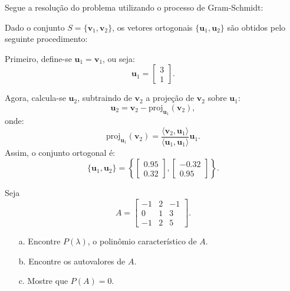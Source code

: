 \begin{resolution}
  Segue a resolução do problema utilizando o processo de Gram-Schmidt:

  Dado o conjunto \( S = \{\mathbf{v}_1, \mathbf{v}_2\} \), os vetores ortogonais \( \{\mathbf{u}_1, \mathbf{u}_2\} \) são obtidos pelo seguinte procedimento:

  Primeiro, define-se \( \mathbf{u}_1 = \mathbf{v}_1 \), ou seja:
  \[
    \mathbf{u}_1 = \begin{bmatrix} 3 \\ 1 \end{bmatrix}.
  \]

  Agora, calcula-se \( \mathbf{u}_2 \), subtraindo de \( \mathbf{v}_2 \) a projeção de \( \mathbf{v}_2 \) sobre \( \mathbf{u}_1 \):
  \[
    \mathbf{u}_2 = \mathbf{v}_2 - \text{proj}_{\mathbf{u}_1}(\mathbf{v}_2),
  \]
  onde:
  \[
    \text{proj}_{\mathbf{u}_1}(\mathbf{v}_2) = \frac{\langle \mathbf{v}_2, \mathbf{u}_1 \rangle}{\langle \mathbf{u}_1, \mathbf{u}_1 \rangle} \mathbf{u}_1.
  \]
  Assim, o conjunto ortogonal é:
  \[
    \{\mathbf{u}_1, \mathbf{u}_2\} = \left\{ \begin{bmatrix} 0.95 \\ 0.32 \end{bmatrix}, \begin{bmatrix} -0.32 \\ 0.95 \end{bmatrix} \right\}.
  \]
\end{resolution}

\begin{question}
  Seja
  \[
    A =
    \begin{bmatrix}
      -1 & 2 & -1 \\
      0  & 1 & 3  \\
      -1 & 2 & 5
    \end{bmatrix}.
  \]
  \begin{itemize}
    \item[a.] Encontre $P(\lambda)$, o polinômio característico de $A$.
    \item[b.] Encontre os autovalores de $A$.
    \item[c.] Mostre que $P(A) = 0$.
  \end{itemize}
\end{question}

